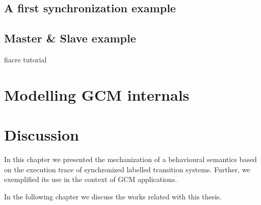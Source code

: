 \subsection{A first synchronization example}	
\label{sub:synchex}



\subsection{Master \& Slave example }	
\label{sub:masterslave}

fiacre tutorial


\section{Modelling GCM internals}
\label{sec:gcmpnets}



\section{Discussion}
\label{sec:behaviourdiscussion}


	


\chapbreak

	In this chapter we presented the mechanization of a behavioural 
semantics based on the execution trace of synchronized labelled transition systems. Further, we
exemplified its use in the context of \ac{GCM} applications.
	
	In the following chapter we discuss the works related with this thesis.



